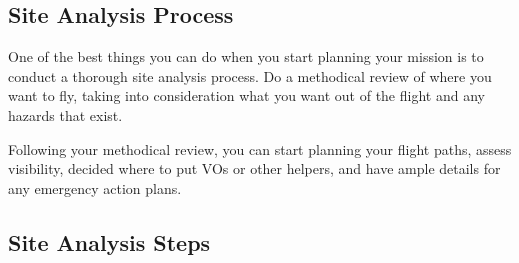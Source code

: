 \documentclass[
  12pt,
]{book}
\begin{document}
\hypertarget{site-analysis-process}{%
\subsection{Site Analysis Process}\label{site-analysis-process}}

One of the best things you can do when you start planning your mission is to conduct a thorough site analysis process. Do a methodical review of where you want to fly, taking into consideration what you want out of the flight and any hazards that exist.

Following your methodical review, you can start planning your flight paths, assess visibility, decided where to put VOs or other helpers, and have ample details for any emergency action plans.

\hypertarget{site-analysis-steps}{%
\subsection{Site Analysis Steps}\label{site-analysis-steps}}
\end{document}
